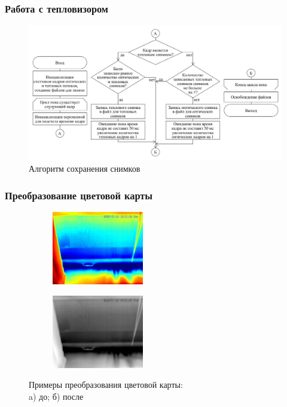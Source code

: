 \documentclass[t]{beamer}
\begin{document}
	\begin{frame}
		\frametitle{Работа с тепловизором}
		\vspace*{-0.45cm}
		\begin{figure}[h!]
			\centering
			\includegraphics[width = \textwidth]{image/chapter_2/loaddata}	
			\caption{Алгоритм сохранения снимков}
			\label{fig:loaddata}
		\end{figure}
	\end{frame}

	\begin{frame}
		\frametitle{Преобразование цветовой карты}
		\vspace*{0.45cm}
		\begin{figure}[ht!]
			\begin{subfigure}{.45\textwidth}
				\centering
				\includegraphics[width = 4cm]{image/chapter_2/tep_example}
				\caption{}
			\end{subfigure}
			\begin{subfigure}{.45\textwidth}
				\centering
				\includegraphics[width = 4cm]{image/chapter_2/gray_tep_example}
				\caption{}
			\end{subfigure}
			\centering
			\caption{Примеры преобразования цветовой карты:\\ a) до; б) после}
			\label{fig:ResKNN}
		\end{figure}
	\end{frame}
\end{document}
